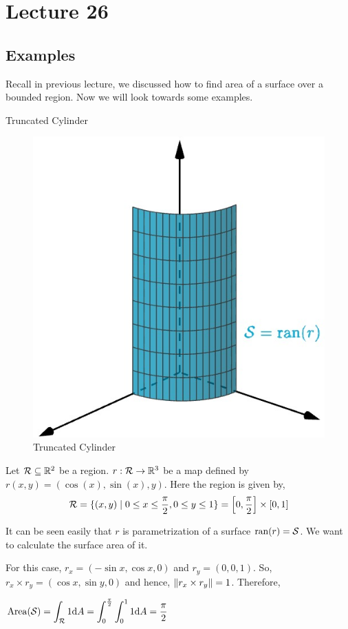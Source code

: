 \documentclass[../Analysis-3.tex]{subfiles}
\begin{document}
\chapter*{Lecture 26} %
\setcounter{chapter}{26} %
\setcounter{section}{0}
\setcounter{equation}{0}
\setcounter{figure}{0}


\section{Examples}
Recall in previous lecture, we discussed how to find area of a surface over a bounded region. Now we will look towards some examples.

\begin{Eg}{Truncated Cylinder}{}

  \begin{figure}
    \centering
    \includegraphics[width=.78\linewidth]{../figures/lec-26.1.png}
    \caption{Truncated Cylinder}
  \end{figure}

  Let $\mathcal{R} \subseteq \mathbb{R}^2$ be a region. $r : \mathcal{R} \to \mathbb{R}^3$ be a map defined by $r(x,y) = (\cos(x),\sin(x),y)$. Here the region is given by,
  \[\mathcal{R} = \{(x,y) \mid 0 \le x \le \frac{\pi}{2}, 0\le y \le 1\} = \qty[0,\frac{\pi}{2}] \times [0,1] \]

  It can be seen easily that $r$ is parametrization of a surface $\operatorname{ran}(r) = \mathcal{S}$. We want to calculate the surface area of it.

  For this case, $r_x = (-\sin x, \cos x, 0)$ and $r_y =(0,0,1)$. So, $ r_x \times r_y = (\cos x, \sin y, 0)$ and hence, $\norm{r_x \times r_y} = 1$. Therefore,

  $\displaystyle \operatorname{Area}(\mathcal{S}) = \int_{\mathcal{R}} 1 \dd A = \int_0^{\frac{\pi}{2}} \int_{0}^1 1 \dd A = \frac{\pi}{2}$

\end{Eg}
\end{document}
